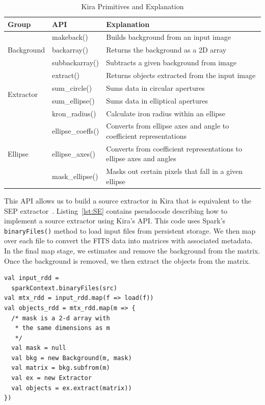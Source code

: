 \documentclass[10pt, conference, compsocconf]{IEEEtran}
\newcommand{\up}{\vspace*{-1em}}
\begin{document}
\begin{table}[t]
\begin{center}
\caption{Kira Primitives and Explanation}
\label{tb:Primitives}
\begin{tabular}{ |l|l|l| }
\hline
Group & API & Explanation \\ \hline \hline
\multirow{3}{*}{Background} & makeback() & Builds background from an input image \\
 & backarray() & Returns the background as a 2D array \\
 & subbackarray() & Subtracts a given background from image \\ \hline
\multirow{4}{*}{Extractor} & extract() & Returns objects extracted from the input image \\
 & sum\_circle() & Sums data in circular apertures \\
 & sum\_ellipse() & Sums data in elliptical apertures \\ 
 & kron\_radius() & Calculate iron radius within an ellipse \\ \hline
\multirow{3}{*}{Ellipse} & ellipse\_coeffs() & Converts from ellipse axes and angle to coefficient representations \\
 & ellipse\_axes() & Converts from coefficient representations to ellipse axes and angles \\ 
 & mask\_ellipse() & Masks out certain pixels that fall in a given ellipse \\ \hline
\end{tabular}
\up
\end{center}
\end{table}

This API allows us to build a source extractor in Kira that is equivalent to the SEP
extractor~\cite{barbary2015}.
Listing~\ref{lst:SE} contains pseudocode describing how to implement a source extractor
using Kira's API. This code uses Spark's \texttt{binaryFiles()} method to load input
files from persistent storage. We then map over each file to convert the FITS data into
matrices with associated metadata. In the final map stage, we estimates and remove the
background from the matrix. Once the background is removed, we then extract the objects
from the matrix.

\begin{lstlisting}[caption=Objects Extraction Logic, label=lst:SE, linewidth=0.5\textwidth, xleftmargin=2.5ex]
val input_rdd = 
  sparkContext.binaryFiles(src)
val mtx_rdd = input_rdd.map(f => load(f))
val objects_rdd = mtx_rdd.map(m => {
  /* mask is a 2-d array with 
   * the same dimensions as m
   */
  val mask = null
  val bkg = new Background(m, mask)
  val matrix = bkg.subfrom(m)
  val ex = new Extractor
  val objects = ex.extract(matrix))
})
\end{lstlisting}
\end{document}
